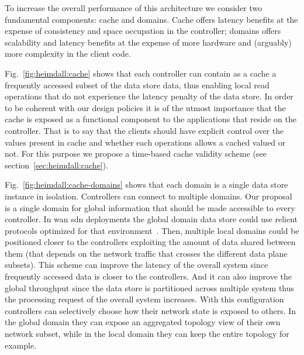
To increase the overall performance of this architecture we consider two fundamental components: cache and domains. Cache offers latency benefits at the expense of consistency and space occupation in the controller; domains offers scalability and latency benefits at the expense of more hardware and (arguably) more complexity in the client code. 

Fig.~\ref{fig:heimdall:cache} shows that each controller can contain as a cache a frequently accessed subset of the data store  data, thus enabling local read operations that do not experience the latency penalty of the data store.
In order to be coherent with our design policies it is of the utmost importance that the cache is exposed as a functional component to the applications that reside on the controller. That is to say that the clients should have explicit control  over the values present in cache and whether each operations allows a cached valued or not. For this purpose we propose a time-based cache validity scheme (see section~\ref{sec:heimdall:cache}). 

Fig.~\ref{fig:heimdall:cache-domains} shows that each domain is a single data store instance in isolation. Controllers can connect to multiple domains. Our proposal is a single domain for global information that should be made accessible to every controller. In \gls{wan} \gls{sdn} deployments  the global domain data store could use relient protocols optimized for that environment~\cite{mao2008mencius}.  Then, multiple local domains could be positioned closer to  the controllers exploiting the amount of data shared between them (that depends on the network traffic that crosses the different data plane subsets).  
This scheme can improve the latency of the overall system since frequently accessed data is closer to the controllers. 
And it can also improve the  global throughput since the data store is partitioned across multiple system thus the processing request of the overall system increases. 
With this configuration controllers can selectively choose how their network state is exposed to others. In the global domain they can expose an aggregated topology view of their own network subset, while in the local domain they can keep the entire topology for example. 

